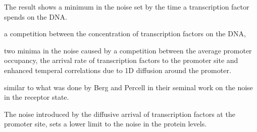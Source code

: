 The result shows a minimum in the noise set by the time a transcription factor spends on the DNA. 

a competition between the concentration of transcription factors on the DNA, 


two minima in the noise caused by a competition between the average promoter occupancy, the arrival rate of transcription factors to the promoter site and enhanced temperal correlations due to 1D diffusion around the promoter. 

similar to what was done by Berg and Percell in their seminal work on the noise in the receptor state. 


The noise introduced by the diffusive arrival of transcription factors at the promoter site, sets a lower limit to the noise in the protein levels. 